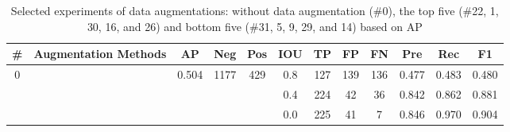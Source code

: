 \documentclass[authoryear,preprint,review,12pt]{elsarticle}
\begin{document}
\begin{table}
\scriptsize
\caption{Selected experiments of data augmentations: without data augmentation (\#0), the top five (\#22, 1, 30, 16, and 26) and bottom five (\#31, 5, 9, 29, and 14) based on AP}
\label{table_acc_imgaug}
\begin{tabular}{c >{\centering\arraybackslash}m{2.2cm} c c  c ccc c c c c}
\toprule
\textbf{\#}&\textbf{Augmentation Methods}&\textbf{AP}&\textbf{Neg}&\textbf{Pos}&\textbf{IOU}&\textbf{TP}&\textbf{FP}&\textbf{FN}&\textbf{Pre}&\textbf{Rec}&\textbf{F1} \\
\midrule 

\multirow{3}{*}{0} &  \multirow{3}{*}{} & \multirow{3}{*}{0.504} & \multirow{3}{*}{1177} & \multirow{3}{*}{429} &0.8 & 127   & 139   & 136   & 0.477  & 0.483  & 0.480   \\ [-1ex]
 &  & &  &   & 0.4 & 224   & 42    & 36    & 0.842  & 0.862  & 0.881   \\[-1ex]
 &  & &  &   & 0.0 & 225   & 41    & 7     & 0.846  & 0.970  & 0.904   \\[-1ex]

\hline 
\hline


\end{tabular}
\end{table}
\end{document}
